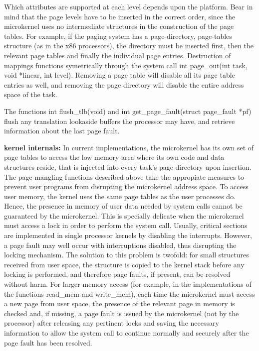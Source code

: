 \documentclass[11pt, letterpaper, twoside, english]{book}
\begin{document}
Which attributes are supported at each level depends upon the platform. Bear in mind that the page levels have to be inserted in the correct order, since the microkernel uses no intermediate structures in the construction of the page tables. For example, if the paging system has a page-directory, page-tables structure (as in the x86 processors), the directory must be inserted first, then the relevant page tables and finally the individual page entries. Destruction of mappings functions symetrically through the system call \textsf{int page\_out(int task, void *linear, int level)}. Removing a page table will disable all its page table entries as well, and removing the page directory will disable the entire address space of the task.

The functions \textsf{int flush\_tlb(void)} and \textsf{int get\_page\_fault(struct page\_fault *pf)} flush any translation lookaside buffers the processor may have, and retrieve information about the last page fault.

\textbf{kernel internals:} In current implementations, the microkernel has its own set of page tables to access the low memory area where its own code and data structures reside, that is injected into every task's page directory upon insertion. The page mangling functions described above take the appropiate measures to prevent user programs from disrupting the microkernel address space. To access user memory, the kernel uses the same page tables as the user processes do. Hence, the presence in memory of user data needed by system calls cannot be guaranteed by the microkernel. This is specially delicate when the microkernel must access a lock in order to perform the system call. Usually, critical sections are implemented in single processor kernels by disabling the interrupts. However, a page fault may well occur with interruptions disabled, thus disrupting the locking mechanism. The solution to this problem is twofold: for small structures received from user space, the structure is copied to the kernel stack before any locking is performed, and therefore page faults, if present, can be resolved without harm. For larger memory access (for example, in the implementations of the functions \textsf{read\_mem} and \textsf{write\_mem}), each time the microkernel must access a new page from user space, the presence of the relevant page in memory is checked and, if missing, a page fault is issued by the microkernel (not by the processor) after releasing any pertinent locks and saving the necessary information to allow the system call to continue normally and securely after the page fault has been resolved.
\end{document}
